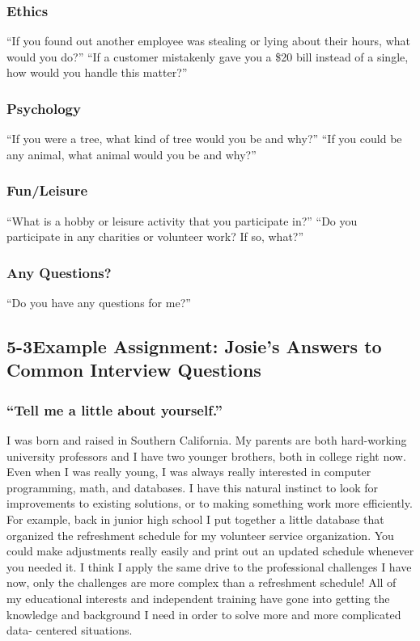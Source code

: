 \subsubsection*{Ethics}
\break ``If you found out another employee was stealing or lying about their hours, what would you do?''
\break ``If a customer mistakenly gave you a \$20 bill instead of a single, how would you handle this matter?''

\subsubsection*{Psychology}
\break ``If you were a tree, what kind of tree would you be and why?''
\break ``If you could be any animal, what animal would you be and why?''

\subsubsection*{Fun/Leisure}
\break ``What is a hobby or leisure activity that you participate in?''
\break ``Do you participate in any charities or volunteer work? If so, what?''

\subsubsection*{Any Questions?}
\break ``Do you have any questions for me?''

\pagebreak \subsection*{5-3\quad Example Assignment: Josie's Answers to Common Interview Questions}
\subsubsection*{``Tell me a little about yourself.''}
\break I was born and raised in Southern California. My parents are both hard-working university professors and I have two younger brothers, both in college right now. Even when I was really young, I was always really interested in computer programming, math, and databases. I have this natural instinct to look for improvements to existing solutions, or to making something work more efficiently. For example, back in junior high school I put together a little database that organized the refreshment schedule for my volunteer service organization. You could make adjustments really easily and print out an updated schedule whenever you needed it. I think I apply the same drive to the professional challenges I have now, only the challenges are more complex than a refreshment schedule! All of my educational interests and independent training have gone into getting the knowledge and background I need in order to solve more and more complicated data- centered situations.

